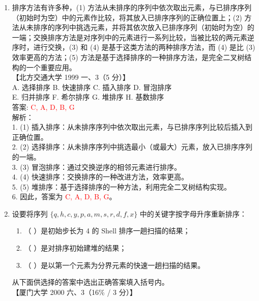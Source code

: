 \documentclass[lang=cn,newtx,10pt,scheme=chinese]{../../../elegantbook}
\begin{document}
\begin{enumerate}
\item 排序方法有许多种，(1) 方法从未排序的序列中依次取出元素，与已排序序列（初始时为空）中的元素作比较，将其放入已排序序列的正确位置上；(2) 方法从未排序的序列中挑选元素，并将其依次放入已排序序列（初始时为空）的一端；交换排序方法是对序列中的元素进行一系列比较，当被比较的两元素逆序时，进行交换，(3) 和 (4) 是基于这类方法的两种排序方法，而 (4) 是比 (3) 效率更高的方法；(5) 方法是基于选择排序的一种排序方法，是完全二叉树结构的一个重要应用。\\
    【北方交通大学 1999 一、3（5 分）】\\  

    A. 选择排序 \quad B. 快速排序 \quad C. 插入排序 \quad D. 冒泡排序 \\  
    E. 归并排序 \quad F. 希尔排序 \quad G. 堆排序 \quad H. 基数排序 \\  

    答案: \textcolor{red}{C, A, D, B, G} \\

    解析：\\
    1. (1) 插入排序：从未排序序列中依次取出元素，与已排序序列比较后插入到正确位置。\\
    2. (2) 选择排序：从未排序序列中挑选最小（或最大）元素，放入已排序序列的一端。\\
    3. (3) 冒泡排序：通过交换逆序的相邻元素进行排序。\\
    4. (4) 快速排序：交换排序的一种改进方法，效率更高。\\
    5. (5) 堆排序：基于选择排序的一种方法，利用完全二叉树结构实现。\\
    6. 因此，答案为 \textcolor{red}{C, A, D, B, G}。\\

\item 设要将序列 $\{q, h, c, y, p, a, m, s, r, d, f, x\}$ 中的关键字按字母升序重新排序：\\

    \begin{enumerate}
        \item （ ）是初始步长为 4 的 Shell 排序一趟扫描的结果；\\
        \item （ ）是对排序初始建堆的结果；\\
        \item （ ）是以第一个元素为分界元素的快速一趟扫描的结果。\\
    \end{enumerate}

    从下面供选择的答案中选出正确答案填入括号内。\\
    【厦门大学 2000 六、3（16\% / 3 分）】\\


\end{enumerate}
\end{document}
